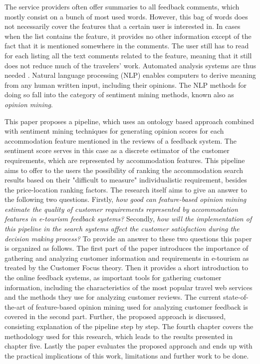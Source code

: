 The service providers often offer summaries to all feedback comments, which mostly consist on a bunch of most used words. However, this bag of words does not necessarily cover the features that a certain user is interested in. In cases when the list contains the feature, it provides no other information except of the fact that it is mentioned somewhere in the comments. The user still has to read for each listing all the text comments related to the feature, meaning that it still does not reduce much of the travelers' work. Automated analysis systems are thus needed \cite{liu2012sentiment}. Natural language processing (NLP) enables computers to derive meaning from any human written input, including their opinions. The NLP methods for doing so fall into the category of sentiment mining methods, known also as \textit{opinion mining}. 

This paper proposes a pipeline, which uses an ontology based approach combined with sentiment mining techniques for generating opinion scores for each accommodation feature mentioned in the reviews of a feedback system. The sentiment score serves in this case as a discrete estimator of the customer requirements, which are represented by accommodation features. This pipeline aims to offer to the users the possibility of ranking the accommodation search results based on their "difficult to measure" individualistic requirement, besides the price-location ranking factors. The research itself aims to give an answer to the following two questions. Firstly, \textit{how good can feature-based opinion mining estimate the quality of customer requirements represented by accommodation features in e-tourism feedback systems?} Secondly, \textit{how will the implementation of this pipeline in the search systems affect the customer satisfaction during the decision making process?} To provide an answer to these two questions this paper is organized as follows. The first part of the paper introduces the importance of gathering and analyzing customer information and requirements in e-tourism as treated by the Customer Focus theory. Then it provides a short introduction to the online feedback systems, as important tools for gathering customer information, including the characteristics of the most popular travel web services and the methods they use for analyzing customer reviews. The current state-of-the-art of feature-based opinion mining used for analyzing customer feedback is covered in the second part. Further, the proposed approach is discussed, consisting explanation of the pipeline step by step. The fourth chapter covers the methodology used for this research, which leads to the results presented in chapter five. Lastly the paper evaluates the proposed approach and ends up with the practical implications of this work, limitations and further work to be done. 

